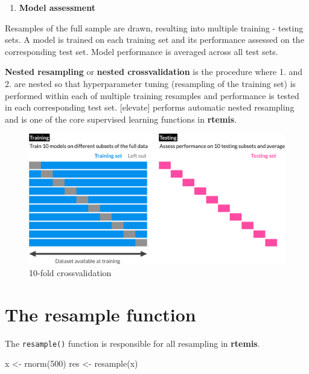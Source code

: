 \documentclass[
]{book}
\newenvironment{Shaded}{\begin{snugshade}}{\end{snugshade}}
\newcommand{\DecValTok}[1]{\textcolor[rgb]{0.00,0.00,0.81}{#1}}
\newcommand{\FunctionTok}[1]{\textcolor[rgb]{0.00,0.00,0.00}{#1}}
\newcommand{\NormalTok}[1]{#1}
\newcommand{\OtherTok}[1]{\textcolor[rgb]{0.56,0.35,0.01}{#1}}
\providecommand{\tightlist}{%
  \setlength{\itemsep}{0pt}\setlength{\parskip}{0pt}}
\begin{document}
\begin{enumerate}
\def\labelenumi{\arabic{enumi}.}
\setcounter{enumi}{1}
\tightlist
\item
  \textbf{Model assessment}
\end{enumerate}

Resamples of the full sample are drawn, resulting into multiple training - testing sets. A model is trained on each training set and its performance assessed on the corresponding test set. Model performance is averaged across all test sets.

\textbf{Nested resampling} or \textbf{nested crossvalidation} is the procedure where 1. and 2. are nested so that hyperparameter tuning (resampling of the training set) is performed within each of multiple training resamples and performance is tested in each corresponding test set. {[}elevate{]} performs automatic nested resampling and is one of the core supervised learning functions in \textbf{rtemis}.

\begin{figure}

{\centering \includegraphics[width=1\linewidth]{./kfold} 

}

\caption{10-fold crossvalidation}\label{fig:kfold}
\end{figure}

\hypertarget{the-resample-function}{%
\section{The resample function}\label{the-resample-function}}

The \texttt{resample()} function is responsible for all resampling in \textbf{rtemis}.

\begin{Shaded}
\begin{Highlighting}[]
\NormalTok{x }\OtherTok{\textless{}{-}} \FunctionTok{rnorm}\NormalTok{(}\DecValTok{500}\NormalTok{)}
\NormalTok{res }\OtherTok{\textless{}{-}} \FunctionTok{resample}\NormalTok{(x)}
\end{Highlighting}
\end{Shaded}
\end{document}
